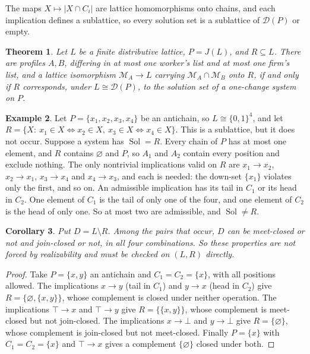 \documentclass[11pt]{amsart}
\newtheorem{theorem}{Theorem}
\newtheorem{corollary}[theorem]{Corollary}
\theoremstyle{definition}
\newtheorem{example}[theorem]{Example}
\theoremstyle{remark}
\newcommand{\D}{\mathcal D}
\newcommand{\Sol}{\operatorname{Sol}}
\begin{document}
The maps $X\mapsto|X\cap C_i|$ are lattice homomorphisms onto chains, and each implication defines a sublattice, so every solution set is a sublattice of $\D(P)$ or empty.

\begin{theorem}\label{thm:main}
Let $L$ be a finite distributive lattice, $P=J(L)$, and $R\subseteq L$. There are profiles $A,B$, differing in at most one worker's list and at most one firm's list, and a lattice isomorphism $\mathcal M_A\to L$ carrying $\mathcal M_A\cap\mathcal M_B$ onto $R$, if and only if $R$ corresponds, under $L\cong\D(P)$, to the solution set of a one-change system on $P$.
\end{theorem}

\begin{example}\label{ex:no}
Let $P=\{x_1,x_2,x_3,x_4\}$ be an antichain, so $L\cong\{0,1\}^4$, and let $R=\{X:\ x_1\in X\Leftrightarrow x_2\in X,\ x_3\in X\Leftrightarrow x_4\in X\}$. This is a sublattice, but it does not occur. Suppose a system has $\Sol=R$. Every chain of $P$ has at most one element, and $R$ contains $\varnothing$ and $P$, so $A_1$ and $A_2$ contain every position and exclude nothing. The only nontrivial implications valid on $R$ are $x_1\to x_2$, $x_2\to x_1$, $x_3\to x_4$ and $x_4\to x_3$, and each is needed: the down-set $\{x_1\}$ violates only the first, and so on. An admissible implication has its tail in $C_1$ or its head in $C_2$. One element of $C_1$ is the tail of only one of the four, and one element of $C_2$ is the head of only one. So at most two are admissible, and $\Sol\ne R$.
\end{example}

\begin{corollary}\label{cor:complement}
Put $D=L\setminus R$. Among the pairs that occur, $D$ can be meet-closed or not and join-closed or not, in all four combinations. So these properties are not forced by realizability and must be checked on $(L,R)$ directly.
\end{corollary}

\begin{proof}
Take $P=\{x,y\}$ an antichain and $C_1=C_2=\{x\}$, with all positions allowed. The implications $x\to y$ (tail in $C_1$) and $y\to x$ (head in $C_2$) give $R=\{\varnothing,\{x,y\}\}$, whose complement is closed under neither operation. The implications $\top\to x$ and $\top\to y$ give $R=\{\{x,y\}\}$, whose complement is meet-closed but not join-closed. The implications $x\to\bot$ and $y\to\bot$ give $R=\{\varnothing\}$, whose complement is join-closed but not meet-closed. Finally $P=\{x\}$ with $C_1=C_2=\{x\}$ and $\top\to x$ gives a complement $\{\varnothing\}$ closed under both.
\end{proof}
\end{document}
